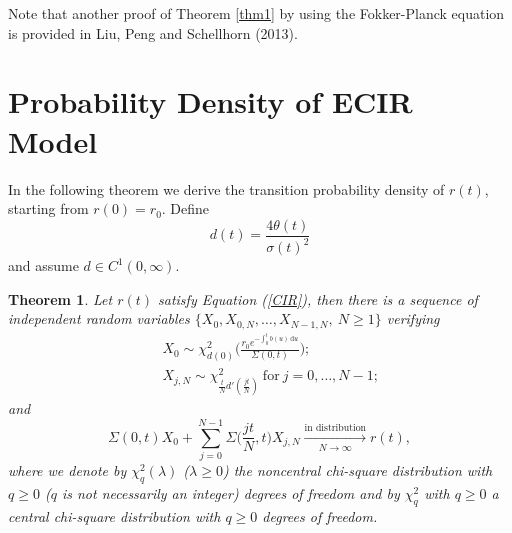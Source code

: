 \documentclass[6pt]{article}
\def\ud{\, \mathrm{d}}
\newtheorem{theorem}{Theorem}[section]
\numberwithin{equation}{section}
\begin{document}
Note that another proof of Theorem \ref{thm1} by using the Fokker-Planck equation is provided in Liu, Peng and Schellhorn (2013).
\section{Probability Density of ECIR Model}
In the following theorem we derive the transition probability density of $r(t)$, starting from $r(0)=r_0$. Define
$$
d(t)=\frac{4\theta(t)}{\sigma(t)^2}
$$
and assume $d\in C^1(0,\infty)$.
\begin{theorem}
\label{thm:density}
Let $r(t)$ satisfy Equation (\ref{CIR}), then there is a sequence of independent random variables $\{X_{0},X_{0,N},\ldots,X_{N-1,N},~N\ge1\}$ verifying
\begin{eqnarray*}
&&X_0\sim \chi_{d(0)}^2\Big(\frac{r_0e^{-\int_0^tb(u)\ud u}}{\Sigma(0,t)}\Big);\\
&&X_{j,N}\sim \chi_{\frac{t}{N}d'(\frac{jt}{N})}^2~\mbox{for}~j=0,\ldots,N-1;
\end{eqnarray*}
and
\begin{equation}
\label{dist}
\Sigma(0,t)X_0+\sum_{j=0}^{N-1}\Sigma\Big(\frac{jt}{N},t\Big)X_{j,N}\xrightarrow[N\rightarrow\infty]{\mbox{in distribution}}r(t),
\end{equation}
where we denote by $\chi_q^2(\lambda)$ ($\lambda\ge0$) the noncentral chi-square distribution with $q\ge0$ ($q$ is not necessarily an integer) degrees of freedom and by $\chi^2_q$ with $q\ge0$ a central chi-square distribution with $q\ge0$ degrees of freedom.
\end{theorem}
\end{document}
